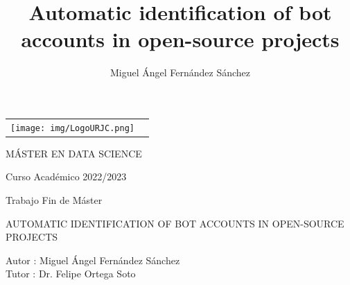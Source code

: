 \documentclass[a4paper, 12pt]{book}
\title{Automatic identification of bot accounts in open-source projects}
\author{Miguel Ángel Fernández Sánchez}
\begin{document}
 


\begin{titlepage}
\begin{center}
\begin{tabular}[c]{c c}
\texttt{[image: img/LogoURJC.png]}
\\
\end{tabular}

\vspace{3cm}

\Large 
MÁSTER EN DATA SCIENCE

\vspace{0.4cm}

\large
Curso Académico 2022/2023

\vspace{0.8cm}

Trabajo Fin de Máster

\vspace{2cm}

\LARGE AUTOMATIC IDENTIFICATION OF BOT ACCOUNTS IN OPEN-SOURCE PROJECTS
\vspace{3cm}

\large
Autor : Miguel Ángel Fernández Sánchez \\
Tutor : Dr. Felipe Ortega Soto
\end{center}
\end{titlepage}

\newpage
\mbox{}
\thispagestyle{empty} %


\clearpage
{}
\chapter*{}
\end{document}
